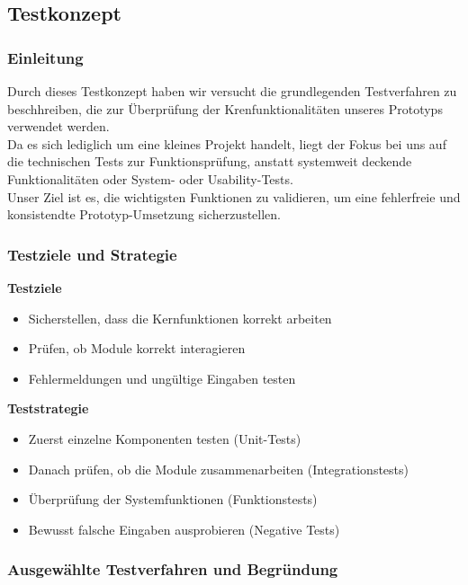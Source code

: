 \newpage
\subsection{Testkonzept}


\subsubsection{Einleitung}

Durch dieses Testkonzept haben wir versucht die grundlegenden Testverfahren zu beschhreiben, die zur Überprüfung der Krenfunktionalitäten unseres Prototyps verwendet werden.\\
Da es sich lediglich um eine kleines Projekt handelt, liegt der Fokus bei uns auf die technischen Tests zur Funktionsprüfung, anstatt systemweit deckende Funktionalitäten oder System- oder Usability-Tests.\\
Unser Ziel ist es, die wichtigsten Funktionen zu validieren, um eine fehlerfreie und konsistendte Prototyp-Umsetzung sicherzustellen.

\subsubsection{Testziele und Strategie}

\textbf{Testziele}

\begin{itemize}
	\item Sicherstellen, dass die Kernfunktionen korrekt arbeiten
	\item Prüfen, ob Module korrekt interagieren
	\item Fehlermeldungen und ungültige Eingaben testen
\end{itemize}

\textbf{Teststrategie}

\begin{itemize}
	\item Zuerst einzelne Komponenten testen (Unit-Tests)
	\item Danach prüfen, ob die Module zusammenarbeiten (Integrationstests)
	\item Überprüfung der Systemfunktionen (Funktionstests)
	\item Bewusst falsche Eingaben ausprobieren (Negative Tests)
\end{itemize}

\subsubsection{Ausgewählte Testverfahren und Begründung}

